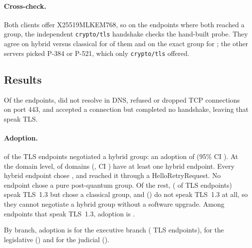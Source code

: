 \paragraph{Cross-check.} Both clients offer X25519MLKEM768, so on the
 endpoints where both reached a group, the
independent \texttt{crypto/tls} handshake checks the hand-built probe. They
agree on hybrid versus classical for  of them and on
the exact group for ; the other
 servers picked P-384 or P-521, which only
\texttt{crypto/tls} offered.

\subsection{Results}

Of the  endpoints,  did not
resolve in DNS,  refused or dropped TCP connections
on port 443, and  accepted a connection but completed
no handshake, leaving  that speak TLS.

\paragraph{Adoption.}  of the
 TLS endpoints negotiated a hybrid group: an
adoption of  (95\% CI ). At the domain
level,  of  domains
(, CI ) have at least one hybrid
endpoint. Every hybrid endpoint chose , and
 reached it through a HelloRetryRequest. No endpoint
chose a pure post-quantum group. Of the rest, 
( of TLS endpoints) speak TLS~1.3 but chose a
classical group, and 
() do not speak TLS~1.3 at all, so they cannot
negotiate a hybrid group without a software upgrade. Among endpoints that
speak TLS~1.3, adoption is .

By branch, adoption is  for the executive branch
( TLS endpoints),
 for the legislative
() and  for the
judicial ().

